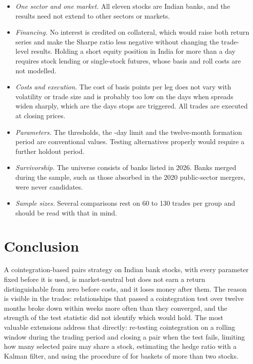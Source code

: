 \documentclass[11pt]{article}
\begin{document}
\begin{itemize}
\item \textit{One sector and one market.} All eleven stocks are Indian banks, and the
  results need not extend to other sectors or markets.
\item \textit{Financing.} No interest is credited on collateral, which would raise
  both return series and make the Sharpe ratio less negative without changing the
  trade-level results. Holding a short equity position in India for more than a day
  requires stock lending or single-stock futures, whose basis and roll costs are not
  modelled.
\item \textit{Costs and execution.} The cost of \BpsLeg{} basis points per leg does
  not vary with volatility or trade size and is probably too low on the days when
  spreads widen sharply, which are the days stops are triggered. All trades are
  executed at closing prices.
\item \textit{Parameters.} The thresholds, the \MaxHold-day limit and the twelve-month
  formation period are conventional values. Testing alternatives properly would
  require a further holdout period.
\item \textit{Survivorship.} The universe consists of banks listed in 2026. Banks
  merged during the sample, such as those absorbed in the 2020 public-sector
  mergers, were never candidates.
\item \textit{Sample sizes.} Several comparisons rest on 60 to 130 trades per group and
  should be read with that in mind.
\end{itemize}

\section{Conclusion}\label{sec:conclusion}

A cointegration-based pairs strategy on Indian bank stocks, with every parameter
fixed before it is used, is market-neutral but does not earn a return
distinguishable from zero before costs, and it loses money after them. The reason
is visible in the trades: relationships that passed a cointegration test over twelve
months broke down within weeks more often than they converged, and the strength of
the test statistic did not identify which would hold. The most valuable extensions
address that directly: re-testing cointegration on a rolling window during the
trading period and closing a pair when the test fails, limiting how many selected
pairs may share a stock, estimating the hedge ratio with a Kalman filter, and using
the procedure of \citet{johansen1988} for baskets of more than two stocks.
\end{document}
